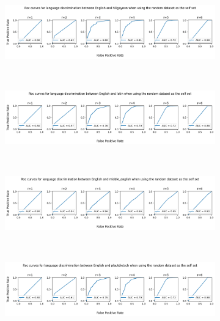 \documentclass{article}
\begin{document}
\begin{figure}[ht]
    \begin{subfigure}[t]{\linewidth}
        \centering
        \includegraphics[width=\linewidth]{images/english_hiligayon_random.png}
        \label{fig:eng_hil_rnd}
    \end{subfigure}
    \\
    \begin{subfigure}[t]{\linewidth}
        \centering
        \includegraphics[width=\linewidth]{images/english_latin_random.png}
        \label{fig:eng_lat_rnd}
    \end{subfigure}
    \\
    \begin{subfigure}[t]{\linewidth}
        \centering
        \includegraphics[width=\linewidth]{images/english_middle_neglish_random.png}
        \label{fig:eng_mid_eng_rnd}
    \end{subfigure}
    \\
    \begin{subfigure}[t]{\linewidth}
        \centering
        \includegraphics[width=\linewidth]{images/english_platudietsch_random.png}

\end{subfigure}
\end{figure}
\end{document}
